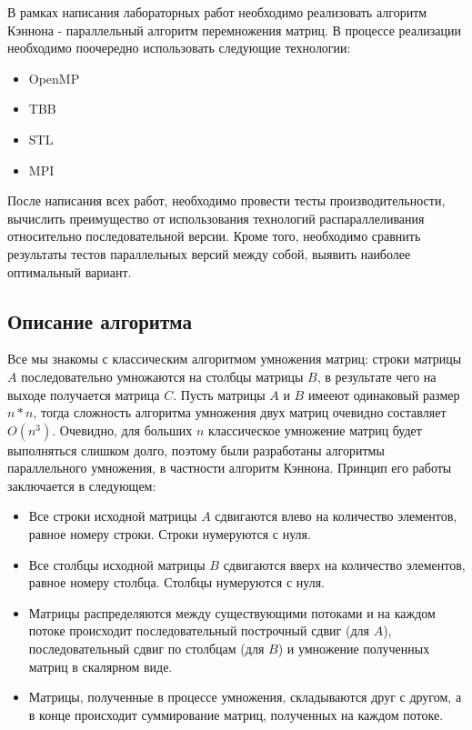 \documentclass[20pt]{article}
\begin{document}
В рамках написания лабораторных работ необходимо реализовать алгоритм Кэннона - параллельный алгоритм перемножения матриц. В процессе реализации необходимо поочередно использовать следующие технологии: \\
\begin{itemize}
    \item OpenMP
    \item TBB
    \item STL
    \item MPI
\end{itemize}

После написания всех работ, необходимо провести тесты производительности, вычислить преимущество от использования технологий распараллеливания относительно последовательной версии. Кроме того, необходимо сравнить результаты тестов параллельных версий между собой, выявить наиболее оптимальный вариант.
\newpage
\begin{center}
    \section{Описание алгоритма}
\end{center}
Все мы знакомы с классическим алгоритмом умножения матриц: строки матрицы $A$ последовательно умножаются на столбцы матрицы $B$, в результате чего на выходе получается матрица $C$. Пусть матрицы $A$ и $B$ имееют одинаковый размер $n*n$, тогда сложность алгоритма умножения двух матриц очевидно составляет $O(n^3)$. Очевидно, для больших $n$ классическое умножение матриц будет выполняться слишком долго, поэтому были разработаны алгоритмы параллельного умножения, в частности алгоритм Кэннона. Принцип его работы заключается в следующем: \\
\begin{itemize}
    \item Все строки исходной матрицы $A$ сдвигаются влево на количество элементов, равное номеру строки. Строки нумеруются с нуля.
    \item Все столбцы исходной матрицы $B$ сдвигаются вверх на количество элементов, равное номеру столбца. Столбцы нумеруются с нуля.
    \item Матрицы распределяются между существующими потоками и на каждом потоке происходит последовательный построчный сдвиг (для $A$), последовательный сдвиг по столбцам (для $B$) и умножение полученных матриц в скалярном виде.
    \item Матрицы, полученные в процессе умножения, складываются друг с другом, а в конце происходит суммирование матриц, полученных на каждом потоке.
\end{itemize} 
\end{document}

